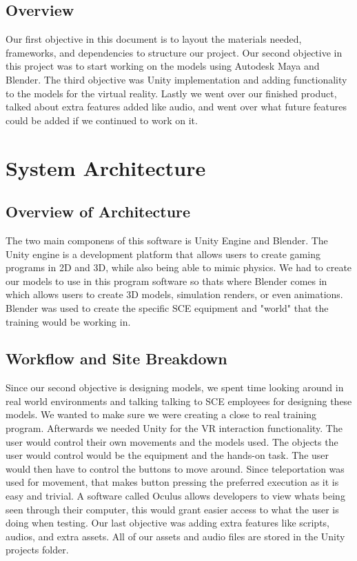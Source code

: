 \documentclass[12pt]{article}
\begin{document}
\subsection{Overview}
Our first objective in this document is to layout the 
materials needed, frameworks, and dependencies to structure our project.
Our second objective in this project was to start working on the models using Autodesk Maya and Blender.
The third objective was Unity implementation and adding functionality to the models for the virtual reality.
Lastly we went over our finished product, talked about extra features added like audio, and went over
what future features could be added if we continued to work on it.

\section{System Architecture}
\subsection{Overview of Architecture}
The two main componens of this software is Unity Engine and Blender.
The Unity engine is a development platform that allows users to create gaming programs in 2D and 3D, while also 
being able to mimic physics. We had to create our models to use in this program software
so thats where Blender comes in which allows users to create 3D models, simulation renders, or even
animations. Blender was used to create the specific SCE equipment and "world" 
that the training would be working in. 

\subsection{Workflow and Site Breakdown}
Since our second objective is designing models, we spent time looking around in real world environments and talking talking 
to SCE employees for designing these models. We wanted to make sure we were creating a close to real training program.
Afterwards we needed Unity for the VR interaction functionality.
The user would control their own movements and the models used.
The objects the user would control would be the equipment and the hands-on task.
The user would then have to control the buttons to move around. Since teleportation was used for movement,
that makes button pressing the preferred execution as it is easy and trivial. A software called Oculus
allows developers to view whats being seen through their computer, 
this would grant easier access to what the user is doing when testing. Our last objective was adding extra features like
scripts, audios, and extra assets. All of our assets and audio files are stored in the Unity projects folder.
\end{document}
